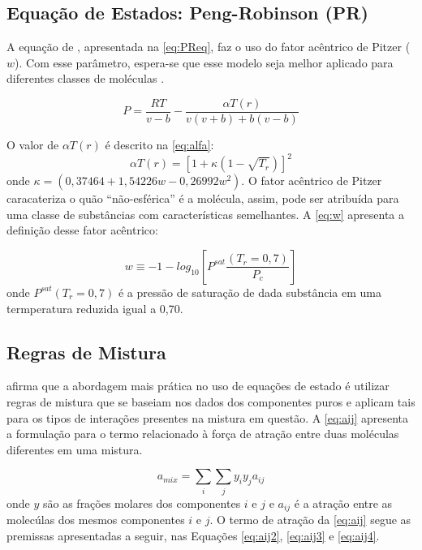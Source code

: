 \subsection{Equação de Estados: Peng-Robinson (PR)}

 A equação de , apresentada na
 \autoref{eq:PReq}, faz o uso do fator acêntrico de Pitzer ($w$). Com esse 
 parâmetro, espera-se que esse modelo seja melhor aplicado para diferentes classes
 de moléculas \cite{Koretsky2013}.
      
\begin{equation}\label{eq:PReq}
P = \frac{RT}{v - b} - \frac{\alpha T(r)}{v(v+b)+b(v-b)}
\end{equation} 

O valor de $\alpha T(r)$ é descrito na \autoref{eq:alfa}:
 \begin{equation}\label{eq:alfa}
\alpha T(r) = [1 +
 \kappa(1-\sqrt{T_r})]^2
\end{equation} 
onde $\kappa = (0,37464+1,54226w-0,26992w^2)$. 
 O fator acêntrico de Pitzer caracateriza o quão ``não-esférica'' é a molécula,
 assim, pode ser atribuída para uma classe de substâncias com
 características semelhantes. A \autoref{eq:w} apresenta a definição desse fator
 acêntrico:
 
  \begin{equation}\label{eq:w}
w \equiv -1 - log_{10}\left [ P^{sat} \frac{( T_r = 0,7 )}{P_c}
\right ]
\end{equation} 
onde $ P^{sat} \left ( T_r = 0,7 \right )$ é a pressão de saturação de dada
substância em uma termperatura reduzida igual a 0,70.

\subsection{Regras de Mistura}

 afirma que a abordagem mais prática no uso de equações de estado
é utilizar regras de mistura que se baseiam nos dados dos componentes puros e 
aplicam tais para os tipos de interações presentes na mistura em questão. A 
\autoref{eq:aij} apresenta a formulação para o termo relacionado à força de
atração entre duas moléculas diferentes em uma mistura.

\begin{equation}\label{eq:aij}
a_{mix} = \sum_i\sum_jy_iy_ja_{ij}
\end{equation}
onde $y$ são as frações molares dos componentes $i$ e $j$ e $a_{ij}$ é a
atração entre as molecúlas dos mesmos componentes $i$ e $j$. O termo de atração
da \autoref{eq:aij} segue as premissas apresentadas a seguir, nas Equações
\ref{eq:aij2}, \ref{eq:aij3} e \ref{eq:aij4}. 

